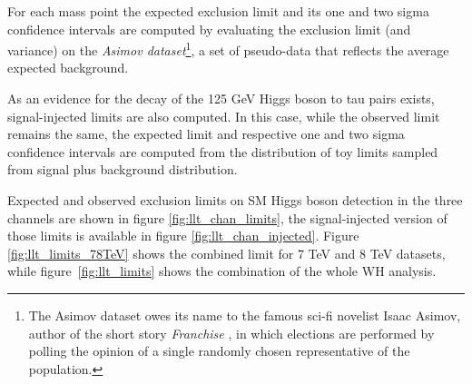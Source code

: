 For each mass point the expected exclusion limit and its one and two sigma confidence intervals are computed  by evaluating the exclusion limit (and variance) on the \emph{Asimov dataset}\footnote{The Asimov dataset owes its name to the famous sci-fi novelist Isaac Asimov, author of the short story \emph{Franchise} \cite{franchise}, in which elections are performed by polling the opinion of a single randomly chosen representative of the population.}, a set of pseudo-data that reflects the average expected background. 

{\color{red}
As an evidence for the decay of the 125 GeV Higgs boson to tau pairs exists, signal-injected limits are also computed. In this case, while the observed limit remains the same, the expected limit and respective one and two sigma confidence intervals are computed from the distribution of toy limits sampled from signal plus background distribution.
}

Expected and observed exclusion limits on SM Higgs boson detection in the three channels are shown in figure \ref{fig:llt_chan_limits}, the signal-injected version of those limits is available in figure \ref{fig:llt_chan_injected}. Figure \ref{fig:llt_limits_78TeV} shows the combined limit for 7 TeV and 8 TeV datasets, while figure~\ref{fig:llt_limits} shows the combination of the whole WH analysis.


